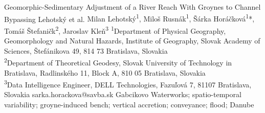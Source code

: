 \abstract
{Geomorphic-Sedimentary Adjustment of a River Reach With Groynes to Channel Bypassing} %
{Lehotský et al.} %
{Milan Lehotský\textsuperscript{1}, Miloš Rusnák\textsuperscript{1}, Šárka Horáčková\textsuperscript{1}*, 
Tomáš Štefaničk\textsuperscript{2}, Jaroslav Kleň\textsuperscript{3}} %
{\TLtag} %
{\textsuperscript{1}Department of Physical Geography, Geomorphology and Natural Hazards, Institute of Geography, Slovak Academy of Sciences, Štefánikova 49, 814 73 Bratislava, Slovakia\\
\textsuperscript{2}Department of Theoretical Geodesy, Slovak University of Technology in Bratislava, Radlinského 11, Block A, 810 05 Bratislava, Slovakia\\
\textsuperscript{3}Data Intelligence Engineer, DELL Technologies, Fazuľová 7, 81107 Bratislava, Slovakia 
} %
{sarka.horackova@savba.sk}  %
{Gabcikovo Waterworks; spatio-temporal variability; groyne-induced bench; vertical accretion; conveyance; flood; Danube }%
